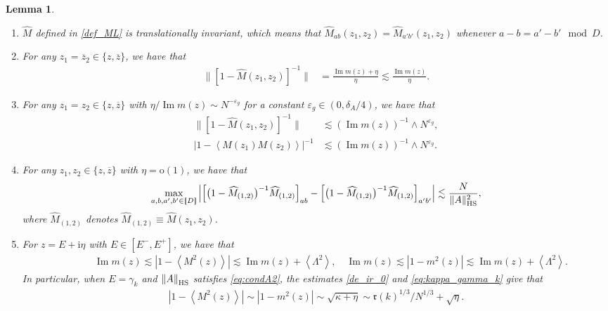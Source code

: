 \documentclass[10pt,reqno]{amsart}
\numberwithin{equation}{section}
\numberwithin{figure}{section}
\theoremstyle{plain} %
\newtheorem{lemma}[theorem]{Lemma}
\theoremstyle{definition} %
\newcommand{\wh}{\widehat}
\renewcommand{\txt}[1]{\text{\rm{#1}}}
\newcommand{\fr}{{\mathfrak{r}}}
\newcommand{\ii}{\mathrm{i}}
\renewcommand{\bar}{\overline}
\newcommand{\qq}[1]{[\![{#1}]\!]}
\newcommand{\pa}[1]{\left({#1}\right)}
\newcommand{\qa}[1]{\left[{#1}\right]}
\newcommand{\absa}[1]{\left\lvert #1 \right\rvert}
\newcommand{\norma}[1]{\left\lVert #1 \right\rVert}
\newcommand{\avga}[1]{\left\langle #1 \right\rangle}
\DeclareMathOperator{\im}{\mathrm{Im}}
\newcommand{\be}{\begin{equation}}
\newcommand{\ee}{\end{equation}}
\newcommand{\oo}{\mathrm{o}}
\newcommand{\HS}{\txt{HS}}
\numberwithin{equation}{section}
\begin{document}
\begin{lemma}
\begin{enumerate}
        \item $\wh M$ defined in \eqref{def_ML} is translationally invariant, which means that $\wh M_{ab}(z_1,z_2)=\wh M_{a'b'}(z_1,z_2)$ whenever $a-b = a'-b' \mod D$.

        \item  For any $z_1 = \bar z_2\in \{z,\bar z\}$, we have that
        \begin{align}
            \big\|[1-\wh M(z_1,z_2)]^{-1}\big\|& = \frac{\im m(z)+\eta} {\eta }\lesssim \frac{\im m (z) }{\eta}.\label{1-M}
        \end{align}

        \item For any $z_1 = z_2\in \{z,\bar z\}$ with $\eta/\im m (z) \sim N^{-\varepsilon_g}$ for a constant $\varepsilon_g\in (0, \delta_A/4)$, we have that
        \begin{align}
            \big\|[1-\wh M(z_1,z_2)]^{-1}\big\|&\lesssim \pa{\im m (z) }^{-1}\wedge N^{\varepsilon_g},\label{1-M-2}\\
            \label{1-M-3}
                \left|1-\avga{M(z_1)M(z_2)}\right|^{-1}&\lesssim \pa{\im m (z) }^{-1}\wedge N^{\varepsilon_g}.
            \end{align}

        \item 
        For any $z_1, z_2\in \{z,\bar z\}$ with $\eta=\oo(1)$, we have that
        \be\label{flat_M}
        \max_{a,b,a',b'\in \qq D}\left|\left[\big(1-\wh M_{(1,2)}\big)^{-1}\wh M_{(1,2)} \right]_{ab}-\left[\big(1-\wh M_{(1,2)}\big)^{-1}\wh M_{(1,2)} \right]_{a'b'}\right|\lesssim \frac{N }{\|A\|_{\HS}^2},
        \ee
        where $\wh M_{(1,2)}$ denotes $\wh M_{(1,2)}\equiv \wh M(z_1,z_2)$.

        \item For $z=E+\ii \eta$ with $E\in \qa{E^-,E^+}$, we have that
        \begin{equation}\label{de_ir_0}
            \begin{aligned}
    \qquad \quad \im m (z) \lesssim \absa{1-\avga{M^2 (z) }}\lesssim \im m (z) +\avga{\Lambda^2},\quad \im m (z) \lesssim\absa{1-m^{2} (z) }\lesssim \im m (z) +\avga{\Lambda^2}.
            \end{aligned}
        \end{equation}
        In particular, when $E=\gamma_k$ and $\norma{A}_{\HS}$ satisfies \eqref{eq:condA2}, the estimates  \eqref{de_ir_0} and \eqref{eq:kappa_gamma_k} give that
        \begin{equation}\label{de_ir_1}
            \begin{aligned}
                \absa{1-\avga{M^2 (z) }}\sim \absa{1-m^2 (z) }\sim \sqrt{\kappa+\eta} \sim \fr\pa{k}^{1/3}/N^{1/3} +\sqrt{\eta}.
            \end{aligned}
        \end{equation}


\end{enumerate}
\end{lemma}
\end{document}
